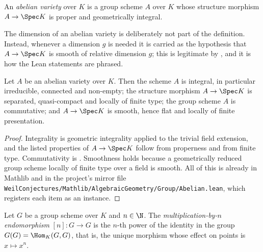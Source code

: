 \begin{definition}\label{def:av-abelian-variety}
\leanok
An \emph{abelian variety} over $K$ is a group scheme $A$ over $K$ whose
structure morphism $A\to\Spec K$ is proper and geometrically integral.
\end{definition}

The dimension of an abelian variety is deliberately not part of the definition.
Instead, whenever a dimension $g$ is needed it is carried as the hypothesis
that $A\to\Spec K$ is smooth of relative dimension $g$; this is legitimate by
, and it is how the Lean statements are phrased.

\begin{proposition}
\label{prop:av-basic}
\leanok
Let $A$ be an abelian variety over $K$.  Then the scheme $A$ is integral, in
particular irreducible, connected and non-empty; the structure morphism
$A\to\Spec K$ is separated, quasi-compact and locally of finite type; the group
scheme $A$ is commutative; and $A\to\Spec K$ is smooth, hence flat and locally
of finite presentation.
\end{proposition}
\begin{proof}
\leanok
Integrality is geometric integrality applied to the trivial field extension,
and the listed properties of $A\to\Spec K$ follow from properness and from
finite type.  Commutativity is .  Smoothness holds because
a geometrically reduced group scheme locally of finite type over a field is
smooth.  All of this is already in Mathlib and in the project's mirror file
\texttt{WeilConjectures/Mathlib/AlgebraicGeometry/Group/Abelian.lean}, which
registers each item as an instance.
\end{proof}

\begin{definition}\label{def:av-mulby}
\leanok
Let $G$ be a group scheme over $K$ and $n\in\N$.  The
\emph{multiplication-by-$n$ endomorphism} $[n]\colon G\to G$ is the $n$-th
power of the identity in the group $G(G)=\Hom_K(G,G)$, that is, the unique
morphism whose effect on points is $x\mapsto x^n$.
\end{definition}

